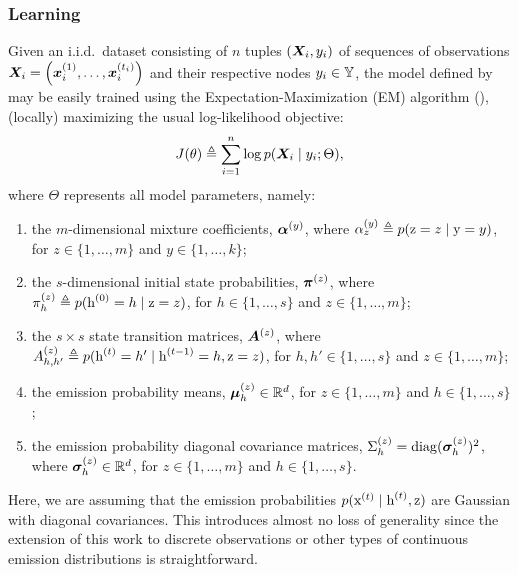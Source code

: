 \subsubsection{Learning}
\label{sec:spamhmm_learning}
Given an i.i.d.\ dataset consisting of $n$ tuples $({\bm{X}}_i, y_i)$ of sequences of observations ${\bm{X}}_i = \left({\bm{x}}_i^{(1)}, \dots,{\bm{x}}_i^{(t_i)} \right)$ and their respective nodes $y_i \in {\mathbb{Y}}$, the model defined by  may be easily trained using the Expectation-Maximization (EM) algorithm (\citet{Dempster1977}), (locally) maximizing the usual log-likelihood objective:
\begin{equation}
\label{eq:spamhmm_log_likelihood}
J(\theta) \triangleq \sum_{i=1}^n \log p({\bm{X}}_i \mid y_i; \Theta),
\end{equation}
where $\Theta$ represents all model parameters, namely:
\begin{enumerate}
	\item the $m$-dimensional mixture coefficients, ${\bm{\alpha}}^{(y)}$, where $ {\alpha}^{(y)}_z \triangleq p({\textnormal{z}}=z \mid {\textnormal{y}}=y)$, for $z \in \{1,\dots,m\}$ and $y \in \{ 1,\dots,k \}$;
	\item the $s$-dimensional initial state probabilities, ${\bm{\pi}}^{(z)}$, where ${\pi}_h^{(z)} \triangleq p({\textnormal{h}}^{(0)}=h \mid {\textnormal{z}}=z)$, for $h \in \{1,\dots,s\}$ and $z \in \{1,\dots,m\}$;
	\item the $s \times s$ state transition matrices, ${\bm{A}}^{(z)}$, where ${A}^{(z)}_{h,h'} \triangleq p({\textnormal{h}}^{(t)}=h' \mid {\textnormal{h}}^{(t-1)}=h, {\textnormal{z}}=z)$, for $h,h' \in \{1,\dots,s\}$ and $z \in \{1,\dots,m\}$;
	\item the emission probability means, ${\bm{\mu}}^{(z)}_h \in \mathbb{R}^d$, for $z \in \{1,\dots,m\}$ and $h \in \{1,\dots,s\}$;
	\item the emission probability diagonal covariance matrices, $\Sigma^{(z)}_h = \mathrm{diag}({\bm{\sigma}}^{(z)}_h)^2$, where ${\bm{\sigma}}^{(z)}_h \in \mathbb{R}^d$, for $z \in \{1,\dots,m\}$ and $h \in \{1,\dots,s\}$.
\end{enumerate}

Here, we are assuming that the emission probabilities $p({\textnormal{x}}^{(t)}\mid{\textnormal{h}}^{(t)},{\textnormal{z}})$ are Gaussian with diagonal covariances. This introduces almost no loss of generality since the extension of this work to discrete observations or other types of continuous emission distributions is straightforward.

